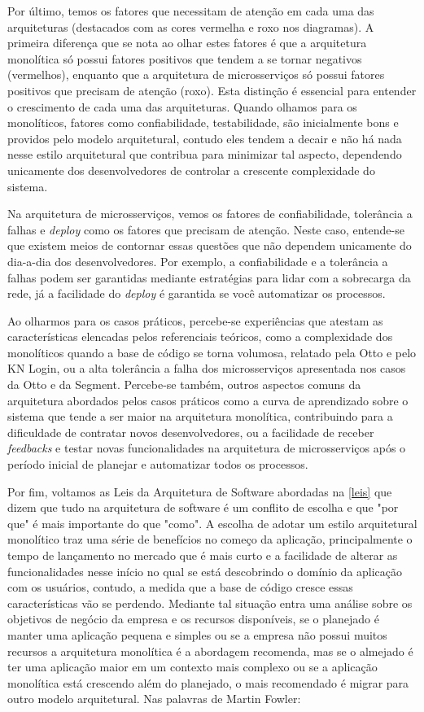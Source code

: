 Por último, temos os fatores que necessitam de atenção em cada uma das arquiteturas (destacados com as
cores vermelha e roxo nos diagramas). A primeira diferença que se nota ao olhar estes fatores é que
a arquitetura monolítica só possui fatores positivos que tendem a se tornar negativos (vermelhos),
enquanto que a arquitetura de microsserviços só possui fatores positivos que precisam de atenção
(roxo). Esta distinção é essencial para entender o crescimento de cada uma das arquiteturas. Quando
olhamos para os monolíticos, fatores como confiabilidade, testabilidade, são inicialmente bons e
providos pelo modelo arquitetural, contudo eles tendem a decair e não há nada nesse estilo arquitetural
que contribua para minimizar tal aspecto, dependendo unicamente dos desenvolvedores de controlar a
crescente complexidade do sistema.

Na arquitetura de microsserviços, vemos os fatores de confiabilidade, tolerância a falhas e \textit{deploy}
como os fatores que precisam de atenção. Neste caso, entende-se que existem meios de contornar essas
questões que não dependem unicamente do dia-a-dia dos desenvolvedores. Por exemplo, a confiabilidade
e a tolerância a falhas podem ser garantidas mediante estratégias para lidar com a sobrecarga da
rede, já a facilidade do \textit{deploy} é garantida se você automatizar os processos.

Ao olharmos para os casos práticos, percebe-se experiências que atestam as características elencadas
pelos referenciais teóricos, como a complexidade dos monolíticos quando a base de código se torna
volumosa, relatado pela Otto e pelo KN Login, ou a alta tolerância a falha dos microsserviços
apresentada nos casos da Otto e da Segment. Percebe-se também, outros aspectos comuns da arquitetura
abordados pelos casos práticos como a curva de aprendizado sobre o sistema que tende a ser maior na
arquitetura monolítica, contribuindo para a dificuldade de contratar novos desenvolvedores, ou a
facilidade de receber \textit{feedbacks} e testar novas funcionalidades na arquitetura de
microsserviços após o período inicial de planejar e automatizar todos os processos.

Por fim, voltamos as Leis da Arquitetura de Software abordadas na \autoref{leis} que dizem que
tudo na arquitetura de software é um conflito de escolha e que "por que" é mais importante do que
"como". A escolha de adotar um estilo arquitetural monolítico traz uma série de benefícios no começo
da aplicação, principalmente o tempo de lançamento no mercado que é mais curto e a facilidade de
alterar as funcionalidades nesse início no qual se está descobrindo o domínio da aplicação com os
usuários, contudo, a medida que a base de código cresce essas características vão se perdendo.
Mediante tal situação entra uma análise sobre os objetivos de negócio da empresa e os recursos
disponíveis, se o planejado é manter uma aplicação pequena e simples ou se a empresa não possui muitos
recursos a arquitetura monolítica é a abordagem recomenda, mas se o almejado é ter uma aplicação maior
em um contexto mais complexo ou se a aplicação monolítica está crescendo além do planejado, o mais
recomendado é migrar para outro modelo arquitetural. Nas palavras de Martin Fowler:


